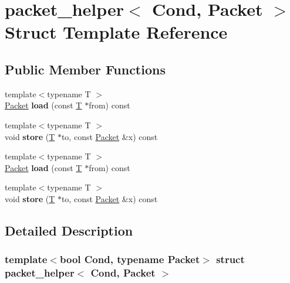 \hypertarget{structpacket__helper}{}\section{packet\+\_\+helper$<$ Cond, Packet $>$ Struct Template Reference}
\label{structpacket__helper}
\subsection*{Public Member Functions}
\begin{DoxyCompactItemize}
\item 
\mbox{\label{structpacket__helper_a1d91e0b096127bc2b9822318c0a3f2f4}} 
{\footnotesize template$<$typename T $>$ }\\\hyperlink{group___sparse_core___module}{Packet} {\bfseries load} (const \hyperlink{group___sparse_core___module}{T} $\ast$from) const
\item 
\mbox{\label{structpacket__helper_a9629877002854702a89f1773673adf28}} 
{\footnotesize template$<$typename T $>$ }\\void {\bfseries store} (\hyperlink{group___sparse_core___module}{T} $\ast$to, const \hyperlink{group___sparse_core___module}{Packet} \&x) const
\item 
\mbox{\label{structpacket__helper_a1d91e0b096127bc2b9822318c0a3f2f4}} 
{\footnotesize template$<$typename T $>$ }\\\hyperlink{group___sparse_core___module}{Packet} {\bfseries load} (const \hyperlink{group___sparse_core___module}{T} $\ast$from) const
\item 
\mbox{\label{structpacket__helper_a9629877002854702a89f1773673adf28}} 
{\footnotesize template$<$typename T $>$ }\\void {\bfseries store} (\hyperlink{group___sparse_core___module}{T} $\ast$to, const \hyperlink{group___sparse_core___module}{Packet} \&x) const
\end{DoxyCompactItemize}


\subsection{Detailed Description}
\subsubsection*{template$<$bool Cond, typename Packet$>$\newline
struct packet\+\_\+helper$<$ Cond, Packet $>$}



